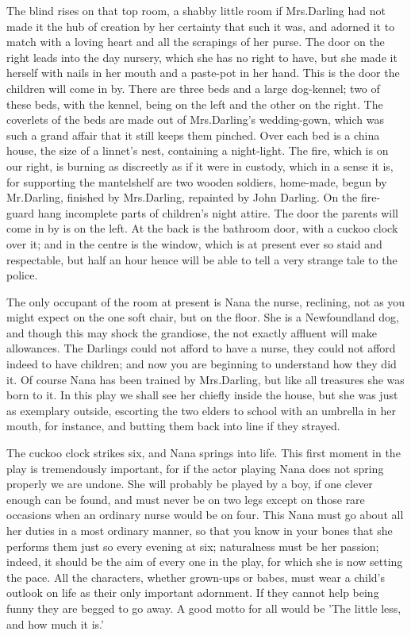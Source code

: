\begin{stagedir}
The blind
rises on that top room,
a shabby little room if Mrs.\@ Darling had not made it the hub of creation by her certainty that such it was,
and adorned it to match with a loving heart and all the scrapings of her purse.
The door on the right leads into the day nursery,
which she has no right to have, but she made it herself with nails in her mouth and a paste-pot in her hand.
This is the door the children will come in by.
There are three beds and  a large dog-kennel;
two of these beds, with the kennel, being on the left and the other on the right.
The coverlets of the beds  are made out of Mrs.\@ Darling's wedding-gown,
which was such a grand affair that it still keeps them pinched.
Over each bed is a china house, the size of a linnet's nest, containing a night-light.
The fire, which is on our right, is burning as discreetly as if it were in custody,
which in a sense it is, for supporting the mantelshelf are two wooden soldiers, home-made,
begun by Mr.\@ Darling, finished by Mrs.\@ Darling, repainted  by John Darling.
On the fire-guard hang incomplete parts of children's night attire.
The door the parents will come in by is on the left.
At the back is the bathroom door, with a cuckoo clock over it;
and in the centre is the window, which is at present ever so staid and respectable,
but half an hour hence  will be able to tell a very strange tale to the police.

The only occupant of the room at present is Nana the nurse,
reclining, not as you might expect on the one soft chair, but on the floor.
She is a Newfoundland dog, and though this may shock the grandiose,
the not exactly affluent will make allowances.
The Darlings could not afford to have a nurse,
they could not afford indeed to have children;
and now you are beginning to understand how they did it.
Of course Nana has been trained by Mrs.\@ Darling,
but like all treasures she was born to it.
In this play we shall see her chiefly inside the house,
but she was just as exemplary outside,
escorting the two elders to school with an umbrella in her mouth, for instance,
and butting them back into line if they strayed.

The cuckoo clock strikes six, and Nana springs into life.
This first moment in the play is tremendously important,
for if the actor playing Nana does not spring properly we are undone.
She will probably be played by a boy, if one clever enough can be found,
and must never be on two legs except on those rare occasions when an ordinary nurse would be on four.
This Nana must go about all her duties in a most ordinary manner,
so that you know in your bones that she performs them just so every evening at six;
naturalness must be her passion;
indeed, it should be the aim of every one in the play, for which she is now setting the pace.
All the characters, whether grown-ups or babes,
must wear a child's outlook on life as their only important adornment.
If they cannot help being funny they are begged to go away.
A good motto for all would be 'The little less, and how much it is.'


\end{stagedir}
